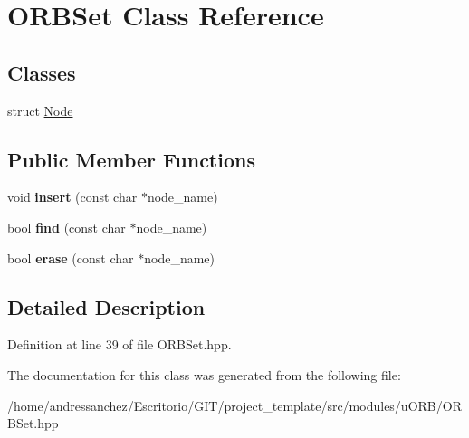 \hypertarget{classORBSet}{}\section{O\+R\+B\+Set Class Reference}
\label{classORBSet}
\subsection*{Classes}
\begin{DoxyCompactItemize}
\item 
struct \hyperlink{structORBSet_1_1Node}{Node}
\end{DoxyCompactItemize}
\subsection*{Public Member Functions}
\begin{DoxyCompactItemize}
\item 
\mbox{\label{classORBSet_a3a2605821e231411fed3e8ab0ad8a611}} 
void {\bfseries insert} (const char $\ast$node\+\_\+name)
\item 
\mbox{\label{classORBSet_ac903d6b53015b957f557d4c42773a77c}} 
bool {\bfseries find} (const char $\ast$node\+\_\+name)
\item 
\mbox{\label{classORBSet_a2d3d5339d7db8b52e168301df480929a}} 
bool {\bfseries erase} (const char $\ast$node\+\_\+name)
\end{DoxyCompactItemize}


\subsection{Detailed Description}


Definition at line 39 of file O\+R\+B\+Set.\+hpp.



The documentation for this class was generated from the following file\+:\begin{DoxyCompactItemize}
\item 
/home/andressanchez/\+Escritorio/\+G\+I\+T/project\+\_\+template/src/modules/u\+O\+R\+B/O\+R\+B\+Set.\+hpp\end{DoxyCompactItemize}
